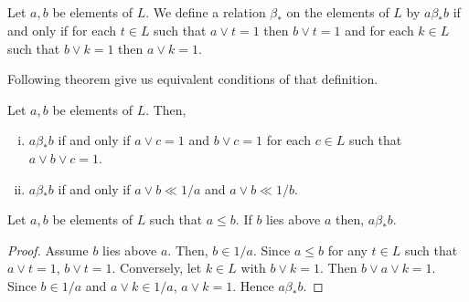 \documentclass[handout]{beamer}
\begin{document}
\subsection*{}
\begin{frame}

\begin{definition}
 Let $ a,b $ be elements of $ L $. We define a relation $ \beta_* $ on the elements of $ L $ by 
  $ a \beta_* b $ if and only if for each $ t \in L $ such that $ a \vee t = 1 $ then $ b \vee t = 1 $ and for each 
  $ k \in L $ such that $ b \vee k = 1 $ then $ a \vee k = 1 $. 
\end{definition}
\pause
Following theorem give us equivalent conditions of that definition.
\pause

    \begin{theorem} \label{4.1.3}
      Let $ a,b $ be elements of $ L $. Then,
      \begin{enumerate}[(i)]
    
        \item
          $ a \beta_* b $ if and only if $ a \vee c = 1 $ and $ b \vee c = 1 $ for each $ c \in L $ 
          such that $ a \vee b  \vee c = 1 $.  \label{4.1.3.1}
    
        \item
          $ a \beta_* b $ if and only if $ a \vee b \ll 1/a $ and $ a \vee b \ll 1/b $.  \label{4.1.3.2}
    
      \end{enumerate}
    \end{theorem}
\end{frame}

\begin{frame}
 \begin{theorem}\label{4.1.8}
  Let $ a,b $ be elements of $ L $ such that $ a \leq b $. 
  If $ b $ lies above $ a $ then, $ a \beta_* b $. 
\end{theorem}

\begingroup
{}
\begin{proof}
  Assume $ b $ lies above $ a $. Then, $ b \in 1/a $. Since $ a \leq b $ for any $ t \in L $ such that $ a \vee t = 1 $, $ b \vee t = 1 $. 
  Conversely, let $ k \in L $ with $ b \vee k = 1 $. Then $ b \vee a \vee k = 1 $. Since $ b \in 1/a $ and $ a \vee k \in 1/a $, $ a \vee k = 1 $. Hence $ a \beta_* b $.
\end{proof}
\endgroup
\end{frame}
\end{document}
